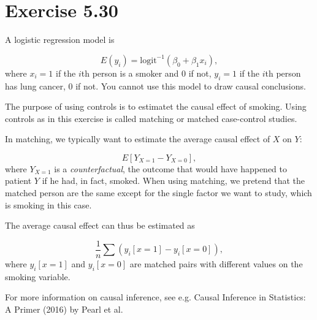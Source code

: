 \section*{Exercise 5.30}

A logistic regression model is

\[
E(y_{i})=\textrm{logit}^{-1}(\beta_{0}+\beta_{1}x_{i}),
\]
where $x_{i}=1$ if the $i$th person is a smoker and $0$ if not,
$y_{i}=1$ if the $i$th person has lung cancer, $0$ if not. You
cannot use this model to draw causal conclusions.

The purpose of using controls is to estimatet the causal effect of
smoking. Using controls as in this exercise is called matching or
matched case-control studies.

In matching, we typically want to estimate the average causal effect
of $X$ on $Y$:

\[
E[Y_{X=1}-Y_{X=0}],
\]
where $Y_{X=1}$ is a \emph{counterfactual}, the outcome that would
have happened to patient $Y$ if he had, in fact, smoked. When using
matching, we pretend that the matched person are the same except for
the single factor we want to study, which is smoking in this case. 

The average causal effect can thus be estimated as

\[
\frac{1}{n}\sum(y_{i}[x=1]-y_{i}[x=0]),
\]
where $y_{i}[x=1]$ and $y_{i}[x=0]$ are matched pairs with different
values on the smoking variable.

For more information on causal inference, see e.g. Causal Inference
in Statistics: A Primer (2016) by Pearl et al.